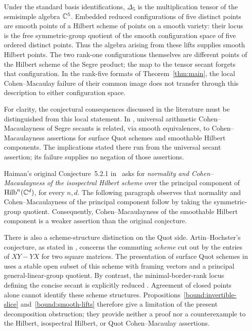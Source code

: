 Under the standard basis identifications, $\Delta_5$ is the
multiplication tensor of the semisimple algebra $\mathbb C^5$.
Embedded reduced configurations of five distinct points are smooth
points of a Hilbert scheme of points on a smooth variety: their locus
is the free symmetric-group quotient of the smooth configuration
space of five ordered distinct points. Thus the algebra arising from
these lifts supplies smooth Hilbert points. The two rank-one
configurations themselves are different points of the Hilbert scheme
of the Segre product; the map to the tensor secant forgets that
configuration. In the rank-five formats of Theorem~\ref{thm:main}, the local
Cohen--Macaulay failure of their common image does not transfer through
this description to either configuration space.

For clarity, the conjectural consequences discussed in the literature
must be distinguished from this local statement. In
\cite[\S3.6.1, following Conjecture~3.32]{JagiellaJelisiejew2026},
universal arithmetic Cohen--Macaulayness of Segre secants is related,
via smooth equivalences, to Cohen--Macaulayness assertions for surface
Quot schemes and smoothable Hilbert components. The implications
stated there run from the universal secant assertion; its failure
supplies no negation of those assertions.

Haiman's original Conjecture~5.2.1 in~\cite{Haiman2001} asks for
\emph{normality and Cohen--Macaulayness of the isospectral Hilbert
scheme} over the principal component of
$\operatorname{Hilb}^n(\mathbb C^d)$, for every $n,d$. The following paragraph
observes that normality and Cohen--Macaulayness of the principal
component follow by taking the symmetric-group quotient. Consequently,
Cohen--Macaulayness of the smoothable Hilbert component is a weaker
assertion than the original conjecture.

There is also a scheme-structure distinction on the Quot side.
Artin--Hochster's conjecture, as stated in
\cite[Conjecture~3.2]{Stark2026}, concerns the commuting \emph{scheme}
cut out by the entries of $XY-YX$ for two square matrices. The
presentation of surface Quot schemes in
\cite[Theorem~3.2]{Stark2026} uses a stable open subset of this
scheme with framing vectors and a principal general-linear-group
quotient. By contrast, the minimal-border-rank locus defining the
concise secant is explicitly reduced
\cite[Definition~3.14(a)]{JagiellaJelisiejew2026}. Agreement of closed
points alone cannot identify these scheme structures.
Propositions~\ref{bound:invertible-slice} and~\ref{bound:smooth-lifts}
therefore give a limitation of the present decomposition obstruction;
they provide neither a proof nor a counterexample to the Hilbert,
isospectral Hilbert, or Quot Cohen--Macaulay assertions.
